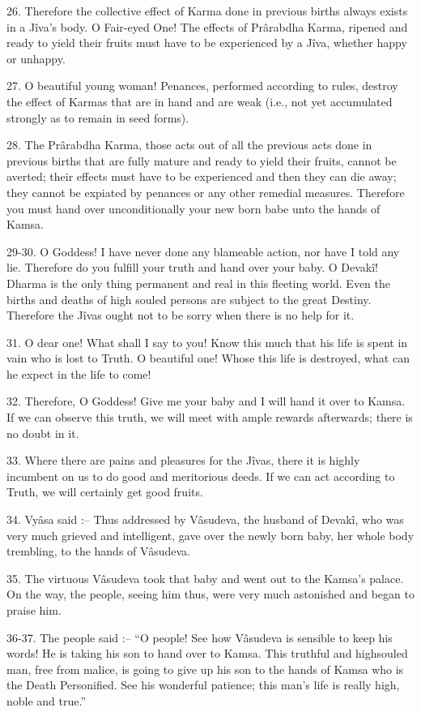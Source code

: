 26. Therefore the collective effect of Karma done in previous births always exists in a J\^iva's body. O Fair-eyed One! The effects of Pr\^arabdha Karma, ripened and ready to yield their fruits must have to be experienced by a J\^iva, whether happy or unhappy.

27. O beautiful young woman! Penances, performed according to rules, destroy the effect of Karmas that are in hand and are weak (i.e., not yet accumulated strongly as to remain in seed forms).

28. The Pr\^arabdha Karma, those acts out of all the previous acts done in previous births that are fully mature and ready to yield their fruits, cannot be averted; their effects must have to be experienced and then they can die away; they cannot be expiated by penances or any other remedial measures. Therefore you must hand over unconditionally your new born babe unto the hands of Kamsa.

29-30. O Goddess! I have never done any blameable action, nor have I told any lie. Therefore do you fulfill your truth and hand over your baby. O Devak\^i! Dharma is the only thing permanent and real in this fleeting world. Even the births and deaths of high souled persons are subject to the great Destiny. Therefore the J\^ivas ought not to be sorry when there is no help for it.

31. O dear one! What shall I say to you! Know this much that his life is spent in vain who is lost to Truth. O beautiful one! Whose this life is destroyed, what can he expect in the life to come!

32. Therefore, O Goddess! Give me your baby and I will hand it over to Kamsa. If we can observe this truth, we will meet with ample rewards afterwards; there is no doubt in it.

33. Where there are pains and pleasures for the J\^ivas, there it is highly incumbent on us to do good and meritorious deeds. If we can act according to Truth, we will certainly get good fruits.

34. Vy\^asa said :-- Thus addressed by V\^asudeva, the husband of Devak\^i, who was very much grieved and intelligent, gave over the newly born baby, her whole body trembling, to the hands of V\^asudeva.

35. The virtuous V\^asudeva took that baby and went out to the Kamsa's palace. On the way, the people, seeing him thus, were very much astonished and began to praise him.

36-37. The people said :-- ``O people! See how V\^asudeva is sensible to keep his words! He is taking his son to hand over to Kamsa. This truthful and highsouled man, free from malice, is going to give up his son to the hands of Kamsa who is the Death Personified. See his wonderful patience; this man's life is really high, noble and true.''

